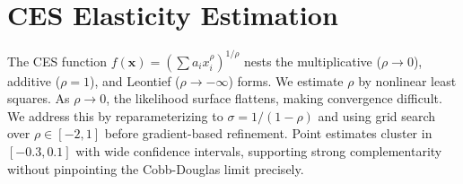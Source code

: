 \documentclass[12pt, a4paper]{article}
\theoremstyle{definition}
\theoremstyle{remark}
\begin{document}
\section{CES Elasticity Estimation}\label{app:ces}

The CES function $f(\mathbf{x}) = \left(\sum a_i x_i^\rho\right)^{1/\rho}$ nests the multiplicative ($\rho \to 0$), additive ($\rho = 1$), and Leontief ($\rho \to -\infty$) forms. We estimate $\rho$ by nonlinear least squares. As $\rho \to 0$, the likelihood surface flattens, making convergence difficult. We address this by reparameterizing to $\sigma = 1/(1-\rho)$ and using grid search over $\rho \in [-2, 1]$ before gradient-based refinement. Point estimates cluster in $[-0.3, 0.1]$ with wide confidence intervals, supporting strong complementarity without pinpointing the Cobb-Douglas limit precisely.
\end{document}
